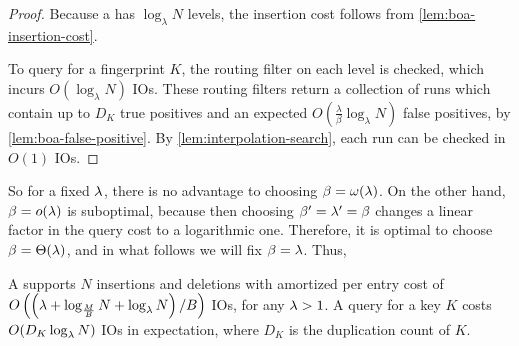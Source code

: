 
\begin{proof}
	Because a \boa{} has $\log_\lambda N$ levels, the insertion cost follows from
	\cref{lem:boa-insertion-cost}.

	To query for a fingerprint $K$, the routing filter on each level is
	checked, which incurs $O(\log_\lambda N)$ IOs. These routing filters return
	a collection of runs which contain up to $D_K$ true positives and an
	expected $O\left(\frac{\lambda}{\beta}\log_\lambda N\right)$ false
	positives, by \cref{lem:boa-false-positive}. By
	\cref{lem:interpolation-search}, each run can be checked in $O(1)$ IOs.
\end{proof}

So for a fixed $\lambda$, there is no advantage to choosing $\beta =
\omega(\lambda)$. On the other hand, $\beta = o(\lambda)$ is suboptimal, because
then choosing $\beta'=\lambda'=\beta$ changes a linear factor in the query cost
to a logarithmic one. Therefore, it is optimal to choose $\beta =
\Theta(\lambda)$, and in what follows we will fix $\beta = \lambda$. Thus,

\begin{lemma}\label{thm:boa-cost-expectation}
	A \boa{} supports $N$ insertions and deletions with amortized
	per entry cost of $O\left(\left(\lambda + \log_{\frac{M}{B}} N +
	\log_\lambda{N} \right)/B\right)$ IOs, for any $\lambda > 1$. A query for a key
	$K$ costs $O(D_K\log_\lambda{N})$ IOs in expectation, where $D_K$ is the
	duplication count of $K$.
\end{lemma}

